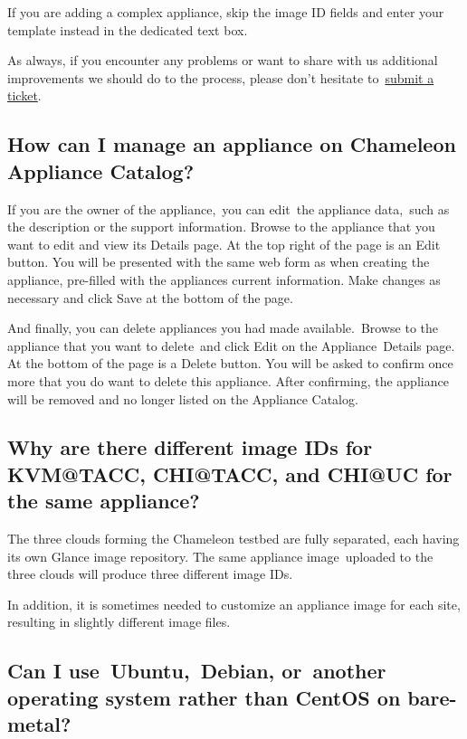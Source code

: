 If you are adding a complex appliance, skip the image ID fields and
enter your template instead in the dedicated text box.

As always, if you encounter any problems or want to share with us
additional improvements we should do to the process, please don't
hesitate to~\href{https://www.chameleoncloud.org/help/}{submit a
ticket}.~

\subsection{How can I manage an appliance on Chameleon Appliance
Catalog?}\label{how-can-i-manage-an-appliance-on-chameleon-appliance-catalog}

If you are the owner of the appliance,~you can edit~the appliance
data,~such as the description or the support information. Browse to the
appliance that you want to edit and view its Details page. At the top
right of the page is an Edit button. You will be presented with the same
web form as when creating the appliance, pre-filled with the appliances
current information. Make changes as necessary and click Save at the
bottom of the page.

And finally, you can delete appliances you had made available.~{Browse
to the appliance that you want to delete~and click Edit on the
Appliance~Details page. At the bottom of the page is a Delete button.
You will be asked to confirm once more that you do want to delete this
appliance}. After confirming, the appliance will be removed and no
longer listed on the Appliance Catalog.

\subsection{Why are there different image IDs for KVM@TACC, CHI@TACC, and
CHI@UC for the same
appliance?}\label{why-are-there-different-image-ids-for-kvmtacc-chitacc-and-chiuc-for-the-same-appliance}

The three clouds forming the Chameleon testbed are fully separated, each
having its own Glance image repository. The same appliance
image~uploaded to the three clouds will produce three different image
IDs.

In addition, it is sometimes needed to customize an appliance image for
each site, resulting in slightly different image files.

\subsection{Can I use~Ubuntu,~Debian, or~another operating system rather
than CentOS on
bare-metal?}\label{can-i-useubuntudebian-oranother-operating-system-rather-than-centos-on-bare-metal}

